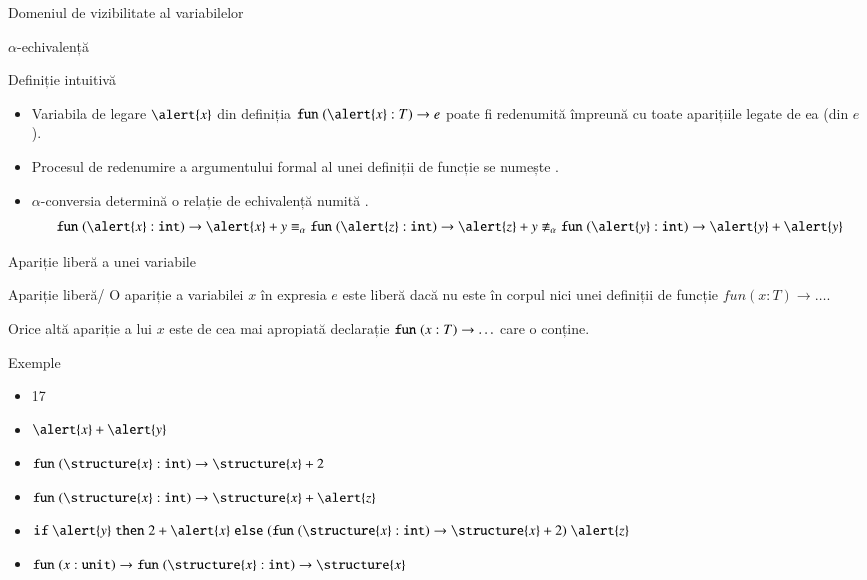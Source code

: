 \documentclass[xcolor=pdftex,romanian,colorlinks]{beamer}
\begin{document}
\begin{section}{Domeniul de vizibilitate al variabilelor}
\begin{frame}{$\alpha$-echivalență}
\begin{block}{Definiție intuitivă}
\begin{itemize}
\item Variabila de legare $\alert{x}$ din definiția $\Sfun (\alert{x}:T) \rightarrow e$ poate fi redenumită împreună cu toate aparițiile legate de ea (din $e$).

\item Procesul de redenumire a argumentului formal al unei definiții de funcție se numește 
.

\item$\alpha$-conversia determină o relație de echivalență numită .
\[\Sfun (\alert{x}:{\Sint})\rightarrow \alert{x} + y \equiv_\alpha {\Sfun (\alert{z}:{\Sint})\rightarrow \alert{z} + y} \not \equiv_\alpha
{\Sfun (\alert{y}:{\Sint})\rightarrow \alert{y} + \alert{y}}
\]\end{itemize}
\end{block}
\end{frame}



\begin{frame}{Apariție liberă a unei variabile}
\begin{block}{Apariție \alert{liberă}/}
O apariție a variabilei $x$ în expresia $e$ este \alert{liberă} dacă nu este în corpul  nici unei definiții de funcție $fun (x:T) \rightarrow \ldots$.

Orice altă apariție a lui $x$ este  de  cea mai apropiată  declarație $\mathrel{\text{\ttfamily fun}} (x:T) \rightarrow \ldots$ care o conține.
\end{block}

\begin{block}{Exemple}
\begin{itemize}
\item 17
\item $\alert{x} + \alert{y}$
\item $\Sfun (\structure{x}:{\Sint}) \rightarrow \structure{x} + 2$
\item $\Sfun (\structure{x}:{\Sint}) \rightarrow \structure{x} + \alert{z}$
\item $\Sif \alert{y} \Sthen 2 + \alert{x} \Selse (\Sfun (\structure{x}:{\Sint}) \rightarrow \structure{x} + 2)\;\alert{z}$
\item \(\Sfun (x:{\Sunit}) \rightarrow {\Sfun (\structure{x}:{\Sint}) \rightarrow \structure{x}}\)
\end{itemize}
\end{block}


\end{frame}
\end{section}
\end{document}
